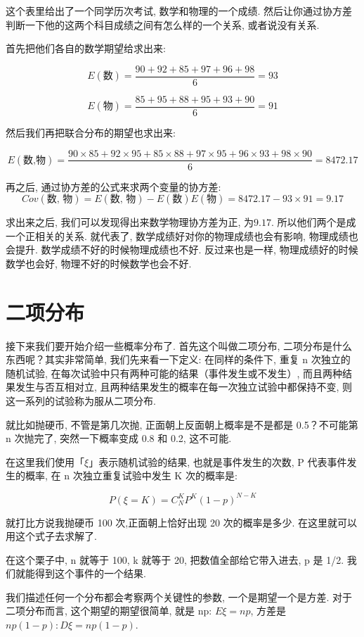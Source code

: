 这个表里给出了一个同学历次考试, 数学和物理的一个成绩. 然后让你通过协方差判断一下他的这两个科目成绩之间有怎么样的一个关系, 或者说没有关系. 

首先把他们各自的数学期望给求出来: 

\[
  E(\mbox{数}) = \frac{90+92+85+97+96+98}{6} = 93
\]

\[
  E(\mbox{物}) = \frac{85+95+88+95+93+90}{6} = 91
\]

然后我们再把联合分布的期望也求出来:

\[
  E(\mbox{数,物}) = \frac{90\times85+92\times95+85\times88+97\times95+96\times93+98\times90}{6} = 8472.17
\]

再之后, 通过协方差的公式来求两个变量的协方差: 
\[Cov(\mbox{数, 物}) = E(\mbox{数, 物}) - E(\mbox{数})E(\mbox{物}) = 8472.17 - 93 \times 91 = 9.17\]

求出来之后, 我们可以发现得出来数学物理协方差为正, 为$9.17$. 所以他们两个是成一个正相关的关系. 就代表了, 数学成绩好对你的物理成绩也会有影响, 物理成绩也会提升. 数学成绩不好的时候物理成绩也不好. 反过来也是一样, 物理成绩好的时候数学也会好, 物理不好的时候数学也会不好. 

\section{二项分布}

接下来我们要开始介绍一些概率分布了. 首先这个叫做二项分布, 二项分布是什么东西呢？其实非常简单, 我们先来看一下定义: 在同样的条件下, 重复 n 次独立的随机试验, 在每次试验中只有两种可能的结果（事件发生或不发生）, 而且两种结果发生与否互相对立, 且两种结果发生的概率在每一次独立试验中都保持不变, 则这一系列的试验称为服从二项分布. 

就比如抛硬币, 不管是第几次抛, 正面朝上反面朝上概率是不是都是 0.5？不可能第 n 次抛完了, 突然一下概率变成 0.8 和 0.2, 这不可能. 

在这里我们使用「$\xi$」表示随机试验的结果, 也就是事件发生的次数,  P 代表事件发生的概率,  在 n 次独立重复试验中发生 K 次的概率是: 

\[P(\xi=K) = C_N^KP^K(1-p)^{N-K}\]

就打比方说我抛硬币 100 次,正面朝上恰好出现 20 次的概率是多少. 在这里就可以用这个式子去求解了. 

在这个栗子中, n 就等于 100, k 就等于 20, 把数值全部给它带入进去, p 是 1/2. 我们就能得到这个事件的一个结果. 

我们描述任何一个分布都会考察两个关键性的参数, 一个是期望一个是方差. 对于二项分布而言, 这个期望的期望很简单, 就是 np: $E\xi = np$, 方差是$np(1-p): D\xi = np(1-p)$. 

